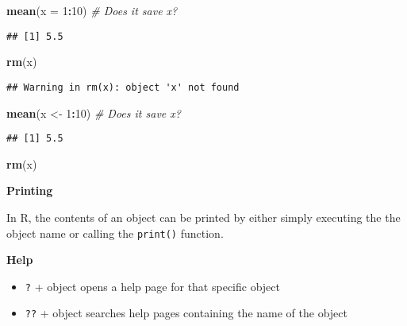 \documentclass[
]{book}
\newenvironment{Shaded}{\begin{snugshade}}{\end{snugshade}}
\newcommand{\CommentTok}[1]{\textcolor[rgb]{0.56,0.35,0.01}{\textit{#1}}}
\newcommand{\DataTypeTok}[1]{\textcolor[rgb]{0.13,0.29,0.53}{#1}}
\newcommand{\DecValTok}[1]{\textcolor[rgb]{0.00,0.00,0.81}{#1}}
\newcommand{\KeywordTok}[1]{\textcolor[rgb]{0.13,0.29,0.53}{\textbf{#1}}}
\newcommand{\NormalTok}[1]{#1}
\newcommand{\OperatorTok}[1]{\textcolor[rgb]{0.81,0.36,0.00}{\textbf{#1}}}
\newcommand{\StringTok}[1]{\textcolor[rgb]{0.31,0.60,0.02}{#1}}
\providecommand{\tightlist}{%
  \setlength{\itemsep}{0pt}\setlength{\parskip}{0pt}}
\begin{document}
\begin{Shaded}
\begin{Highlighting}[]
\KeywordTok{mean}\NormalTok{(}\DataTypeTok{x =} \DecValTok{1}\OperatorTok{:}\DecValTok{10}\NormalTok{) }\CommentTok{\# Does it save x?}
\end{Highlighting}
\end{Shaded}

\begin{verbatim}
## [1] 5.5
\end{verbatim}

\begin{Shaded}
\begin{Highlighting}[]
\KeywordTok{rm}\NormalTok{(x)}
\end{Highlighting}
\end{Shaded}

\begin{verbatim}
## Warning in rm(x): object 'x' not found
\end{verbatim}

\begin{Shaded}
\begin{Highlighting}[]
\KeywordTok{mean}\NormalTok{(x \textless{}{-}}\StringTok{ }\DecValTok{1}\OperatorTok{:}\DecValTok{10}\NormalTok{) }\CommentTok{\# Does it save x?}
\end{Highlighting}
\end{Shaded}

\begin{verbatim}
## [1] 5.5
\end{verbatim}

\begin{Shaded}
\begin{Highlighting}[]
\KeywordTok{rm}\NormalTok{(x)}
\end{Highlighting}
\end{Shaded}

\textbf{Printing}

In R, the contents of an object can be printed by either simply executing the the object name or calling the \texttt{print()} function.

\textbf{Help}

\begin{itemize}
\tightlist
\item
  \texttt{?} + object opens a help page for that specific object
\item
  \texttt{??} + object searches help pages containing the name of the object
\end{itemize}
\end{document}
